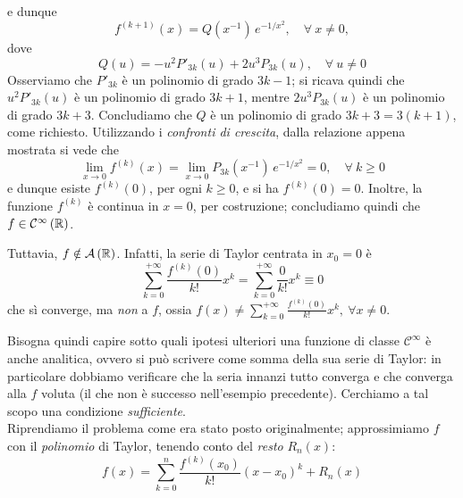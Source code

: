 \begin{examplewt}
\begin{itemize}
\begin{equation*}
\end{equation*}
e dunque
\begin{equation*}
	f^{(k+1)}(x)=Q(x^{-1})\, e^{-1/x^2},\quad \forall \ x\neq 0,
\end{equation*}
dove
\begin{equation*}
	Q(u)=- u^2 P'_{3k}(u) +2u^3 P_{3k}(u),\quad \forall \ u\neq 0
\end{equation*}
Osserviamo che $P'_{3k}$ è un polinomio di grado $3k-1$; si ricava quindi che $u^2P'_{3k}\left(u\right)$ è un polinomio di grado $3k+1$, mentre $2u^3P_{3k}\left(u\right)$ è un polinomio di grado $3k+3$. Concludiamo che $Q$ è un polinomio di grado $3k+3=3\left(k+1\right)$, come richiesto.
Utilizzando i \textit{confronti di crescita}, dalla relazione appena mostrata si vede che
\begin{equation*}
\lim_{x\to 0} f^{(k)}(x)=\lim_{x\to 0} P_{3k}(x^{-1})\, e^{-1/x^2}=0,\quad \forall \ k\geq 0
\end{equation*}
e dunque esiste $f^{(k)}(0)$, per ogni $k\geq 0$, e si ha $f^{(k)}(0)=0$. Inoltre, la funzione $f^{(k)}$ è continua in $x=0$, per costruzione; concludiamo quindi che $f\in \mathcal{C}^{\infty}\left(\mathbb{R}\right)$.
\end{itemize}
Tuttavia, $f\notin\mathcal{A}\left(\mathbb{R}\right)$. Infatti, la serie di Taylor centrata in $x_0=0$ è
\begin{equation*}
	\sum_{k=0}^{+\infty}\frac{f^{\left(k\right)}\left(0\right)}{k!}x^k=\sum_{k=0}^{+\infty}\frac{0}{k!}x^k\equiv 0
\end{equation*}
che sì converge, ma \textit{non} a $f$, ossia $\displaystyle f(x)\neq \sum_{k=0}^{+\infty}\frac{f^{\left(k\right)}\left(0\right)}{k!}x^k,\ \forall x\neq 0$.
\end{examplewt}
Bisogna quindi capire sotto quali ipotesi ulteriori una funzione di classe $\mathcal{C}^{\infty}$ è anche analitica, ovvero si può scrivere come somma della sua serie di Taylor: in particolare dobbiamo verificare che la seria innanzi tutto converga e che converga alla $f$ voluta (il che non è successo nell'esempio precedente). Cerchiamo a tal scopo una condizione \textit{sufficiente}.\\
Riprendiamo il problema come era stato posto originalmente; approssimiamo $f$ con il \textit{polinomio} di Taylor, tenendo conto del \textit{resto} $R_n(x)$:
\begin{equation*}
	f(x)=\sum_{k=0}^{n}\frac{f^{\left(k\right)}\left(x_0\right)}{k!}\left(x-x_0\right)^k+R_n(x)
\end{equation*}
